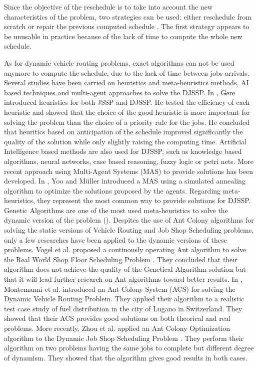 \documentclass[a4paper,10pt]{article}
\begin{document}
Since the objective of the reschedule is to take into account the new characteristics of the problem, two strategies can be used: either reschedule from scratch or repair the previous computed schedule \cite{Ouelhadj2009}. The first strategy appears to be unusable in practice because of the lack of time to compute the whole new schedule.

As for dynamic vehicle routing problems, exact algorithms can not be used anymore to compute the schedule, due to the lack of time between jobs arrivals. Several studies have been carried on heuristics and meta-heuristics methods, AI based techniques and multi-agent approaches to solve the DJSSP.
In \cite{Gere1966}, Gere introduced heuristics for both JSSP and DJSSP. He tested the efficiency of each heuristic and showed that the choice of the good heuristic is more important for solving the problem than the choice of a priority rule for the jobs. He concluded that heuritics based on anticipation of the schedule improved significantly the quality of the solution while only slightly raising the computing time.
Artificial Intelligence based methods are also used for DJSSP, such as knowledge based algorithms, neural networks, case based reasoning, fuzzy logic or petri nets.
More recent approach using Multi-Agent Systems (MAS) to provide solutions has been developed. In \cite{Yoo2002}, Yoo and M\"{u}ller introduced a MAS using a simulated annealing algorithm to optimize the solutions proposed by the agents.
Regarding meta-heuristics, they represent the most common way to provide solutions for DJSSP. Genetic Algorithms are one of the most used meta-heuristics to solve the dynamic version of the problem (\cite{Lin1997, Qi2000}).
Despites the use of Ant Colony algorithms for solving the static versions of Vehicle Routing and Job Shop Scheduling problems, only a few researches have been applied to the dynamic versions of these problems. Vogel et al. proposed a continously operating Ant algorithm to solve the Real World Shop Floor Scheduling Problem \cite{Vogel2002}. They concluded that their algorithm does not achieve the quality of the Genetical Algorithm solution but that it will lead further research on Ant algorithms toward better results.
In \cite{Montemanni2005}, Montemanni et al. introduced an Ant Colony System (ACS) for solving the Dynamic Vehicle Routing Problem. They applied their algorithm to a realistic test case study of fuel distribution in the city of Lugano in Switzerland. They showed that their ACS provides good solutions on both theorical and real problems.
More recently, Zhou et al. applied an Ant Colony Optimization algorithm to the Dynamic Job Shop Scheduling Problem \cite{Zhou2008}. They perform their algorithm on two problems having the same jobs to complete but different degree of dynamism. They showed that the algorithm gives good results in both cases.
\end{document}
